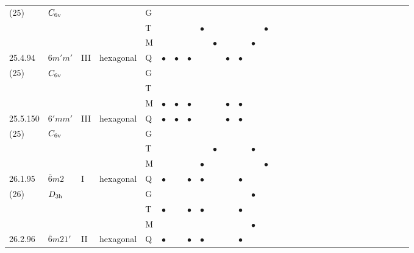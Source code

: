 \documentclass[fleqn,9pt,landscape]{jsarticle}
\begin{document}
\begin{longtable}{lllll|l|l|l|l|l|l|l|l|l|ll|ll|ll|ll|ll|ll|ll|ll}
(25) & $C_{\rm 6v}$ &  &  & G &  &  &  &  &  &  &  &  &  &  &  &  &  &  &  &  &  &  &  &  &  &  &  &  &  \\
 &  &  &  & T &  &  &  & $\bullet$ &  &  &  &  & $\bullet$ &  &  &  &  &  &  &  &  &  &  &  &  &  &  &  &  \\
 &  &  &  & M &  &  &  &  & $\bullet$ &  &  & $\bullet$ &  &  &  &  &  &  &  &  &  &  &  &  &  &  &  &  &  \\ \hline
25.4.94 & \texttt{$6m'm'$} & III & hexagonal & Q & $\bullet$ & $\bullet$ & $\bullet$ &  &  & $\bullet$ & $\bullet$ &  &  &  &  &  &  &  &  &  &  &  &  &  &  &  &  &  &  \\
(25) & $C_{\rm 6v}$ &  &  & G &  &  &  &  &  &  &  &  &  &  &  &  &  &  &  &  &  &  &  &  &  &  &  &  &  \\
 &  &  &  & T &  &  &  &  &  &  &  &  &  &  &  &  &  &  &  &  &  &  &  &  &  &  &  &  &  \\
 &  &  &  & M & $\bullet$ & $\bullet$ & $\bullet$ &  &  & $\bullet$ & $\bullet$ &  &  &  &  &  &  &  &  &  &  &  &  &  &  &  &  &  &  \\ \hline
25.5.150 & \texttt{$6'mm'$} & III & hexagonal & Q & $\bullet$ & $\bullet$ & $\bullet$ &  &  & $\bullet$ & $\bullet$ &  &  &  &  &  &  &  &  &  &  &  &  &  &  &  &  &  &  \\
(25) & $C_{\rm 6v}$ &  &  & G &  &  &  &  &  &  &  &  &  &  &  &  &  &  &  &  &  &  &  &  &  &  &  &  &  \\
 &  &  &  & T &  &  &  &  & $\bullet$ &  &  & $\bullet$ &  &  &  &  &  &  &  &  &  &  &  &  &  &  &  &  &  \\
 &  &  &  & M &  &  &  & $\bullet$ &  &  &  &  & $\bullet$ &  &  &  &  &  &  &  &  &  &  &  &  &  &  &  &  \\ \hline
26.1.95 & \texttt{$\bar{6}m2$} & I & hexagonal & Q & $\bullet$ &  & $\bullet$ & $\bullet$ &  &  & $\bullet$ &  &  &  &  &  &  &  &  &  &  &  &  &  &  &  &  &  &  \\
(26) & $D_{\rm 3h}$ &  &  & G &  &  &  &  &  &  &  & $\bullet$ &  &  &  &  &  &  &  &  &  &  &  &  &  &  &  &  &  \\
 &  &  &  & T & $\bullet$ &  & $\bullet$ & $\bullet$ &  &  & $\bullet$ &  &  &  &  &  &  &  &  &  &  &  &  &  &  &  &  &  &  \\
 &  &  &  & M &  &  &  &  &  &  &  & $\bullet$ &  &  &  &  &  &  &  &  &  &  &  &  &  &  &  &  &  \\ \hline
26.2.96 & \texttt{$\bar{6}m21'$} & II & hexagonal & Q & $\bullet$ &  & $\bullet$ & $\bullet$ &  &  & $\bullet$ &  &  &  &  &  &  &  &  &  &  &  &  &  &  &  &  &  &  \\

\end{longtable}
\end{document}
